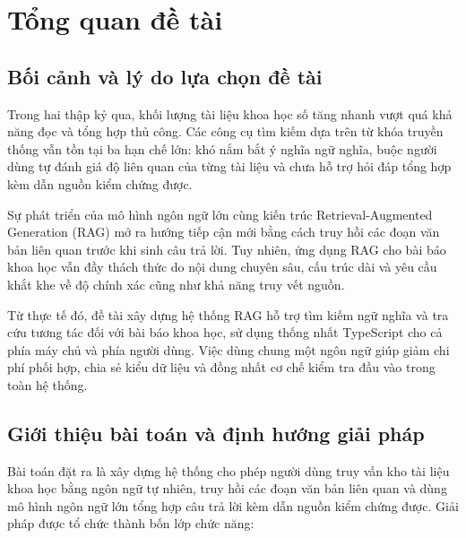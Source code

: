 
\chapter{Tổng quan đề tài}
\label{chap:tong-quan-de-tai}

\section{Bối cảnh và lý do lựa chọn đề tài}
\label{sec:boi-canh-ly-do}

Trong hai thập kỷ qua, khối lượng tài liệu khoa học số tăng nhanh vượt quá khả năng đọc và tổng hợp thủ công. Các công cụ tìm kiếm dựa trên từ khóa truyền thống vẫn tồn tại ba hạn chế lớn: khó nắm bắt ý nghĩa ngữ nghĩa, buộc người dùng tự đánh giá độ liên quan của từng tài liệu và chưa hỗ trợ hỏi đáp tổng hợp kèm dẫn nguồn kiểm chứng được.

Sự phát triển của mô hình ngôn ngữ lớn cùng kiến trúc Retrieval-Augmented Generation (RAG) mở ra hướng tiếp cận mới bằng cách truy hồi các đoạn văn bản liên quan trước khi sinh câu trả lời. Tuy nhiên, ứng dụng RAG cho bài báo khoa học vẫn đầy thách thức do nội dung chuyên sâu, cấu trúc dài và yêu cầu khắt khe về độ chính xác cũng như khả năng truy vết nguồn.

Từ thực tế đó, đề tài xây dựng hệ thống RAG hỗ trợ tìm kiếm ngữ nghĩa và tra cứu tương tác đối với bài báo khoa học, sử dụng thống nhất TypeScript cho cả phía máy chủ và phía người dùng. Việc dùng chung một ngôn ngữ giúp giảm chi phí phối hợp, chia sẻ kiểu dữ liệu và đồng nhất cơ chế kiểm tra đầu vào trong toàn hệ thống.

\section{Giới thiệu bài toán và định hướng giải pháp}
\label{sec:gioi-thieu-bai-toan}

Bài toán đặt ra là xây dựng hệ thống cho phép người dùng truy vấn kho tài liệu khoa học bằng ngôn ngữ tự nhiên, truy hồi các đoạn văn bản liên quan và dùng mô hình ngôn ngữ lớn tổng hợp câu trả lời kèm dẫn nguồn kiểm chứng được. Giải pháp được tổ chức thành bốn lớp chức năng:

